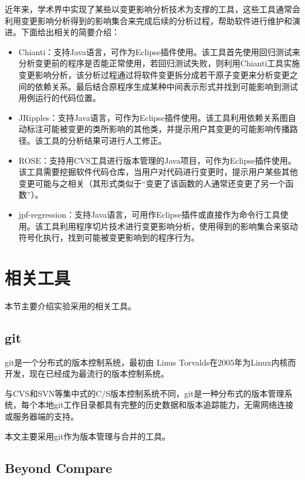 近年来，学术界中实现了某些以变更影响分析技术为支撑的工具，这些工具通常会利用变更影响分析得到的影响集合来完成后续的分析过程，帮助软件进行维护和演进。下面给出相关的简要介绍：
\begin{itemize}
	\item Chianti：支持Java语言，可作为Eclipse插件使用\cite{ren2004chianti}。该工具首先使用回归测试来分析变更前的程序是否能正常使用，若回归测试失败，则利用Chianti工具实施变更影响分析，该分析过程通过将软件变更拆分成若干原子变更来分析变更之间的依赖关系。最后结合原程序生成某种中间表示形式并找到可能影响到测试用例运行的代码位置。
	
	\item JRipples：支持Java语言，可作为Eclipse插件使用\cite{buckner2005jripples,rajlich2004incremental}。该工具利用依赖关系图自动标注可能被变更的类所影响的其他类，并提示用户其变更的可能影响传播路径。该工具的分析结果可进行人工修正。
	
	\item ROSE：支持用CVS工具进行版本管理的Java项目，可作为Eclipse插件使用\cite{zimmermann2005mining}。该工具需要挖掘软件代码仓库，当用户对代码进行变更时，提示用户某些其他变更可能与之相关（其形式类似于“变更了该函数的人通常还变更了另一个函数”）。
	
	\item jpf-regression：支持Java语言，可用作Eclipse插件或直接作为命令行工具使用\cite{person2011directed}。该工具利用程序切片技术进行变更影响分析，使用得到的影响集合来驱动符号化执行，找到可能被变更影响到的程序行为。
\end{itemize}



\section{相关工具}
	本节主要介绍实验采用的相关工具。
	

	\subsection{git}		

git是一个分布式的版本控制系统，最初由 Linus Torvalds在2005年为Linux内核而开发，现在已经成为最流行的版本控制系统。

与CVS和SVN等集中式的C/S版本控制系统不同，git是一种分布式的版本管理系统，每个本地git工作目录都具有完整的历史数据和版本追踪能力，无需网络连接或服务器端的支持。
      
本文主要采用git作为版本管理与合并的工具。

	\subsection{Beyond Compare}
		
